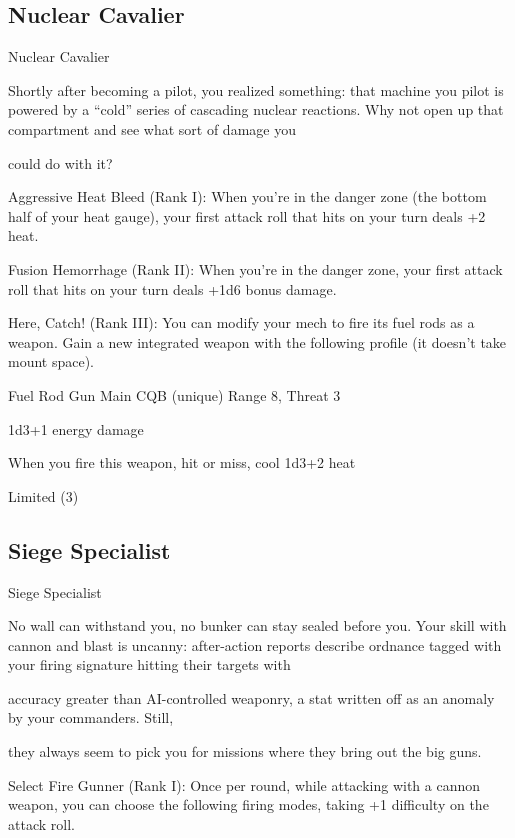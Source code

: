 \subsection{Nuclear Cavalier}

                                             Nuclear Cavalier   

Shortly after becoming a pilot, you realized something: that machine you pilot is powered by a “cold” series  
of cascading nuclear reactions. Why not open up that compartment and see what sort of damage you  

could do with it?   

Aggressive Heat Bleed  (Rank I): When you’re in the danger zone (the bottom half of your heat  
gauge), your first attack roll that hits on your turn deals +2 heat.
 
Fusion Hemorrhage (Rank II): When you’re in the danger zone, your first attack roll that hits on  
your turn deals +1d6 bonus damage.
 
Here, Catch! (Rank III): You can modify your mech to fire its fuel rods as a weapon. Gain a new  
integrated weapon with the following profile (it doesn’t take mount space).
 
         Fuel Rod Gun	   
         Main CQB (unique)  
         Range 8, Threat 3
 
         1d3+1 energy damage
 
         When you fire this weapon, hit or miss, cool 1d3+2 heat
 
         Limited (3)  
\subsection{Siege Specialist}

                                             Siege Specialist  

No wall can withstand you, no bunker can stay sealed before you. Your skill with cannon and blast is  
uncanny: after-action reports describe ordnance tagged with your firing signature hitting their targets with  

accuracy greater than AI-controlled weaponry, a stat written off as an anomaly by your commanders. Still,  

they always seem to pick you for missions where they bring out the big guns.   

Select Fire Gunner (Rank I): Once per round, while attacking with a cannon weapon, you can  
choose the following firing modes, taking +1 difficulty on the attack roll.
 
